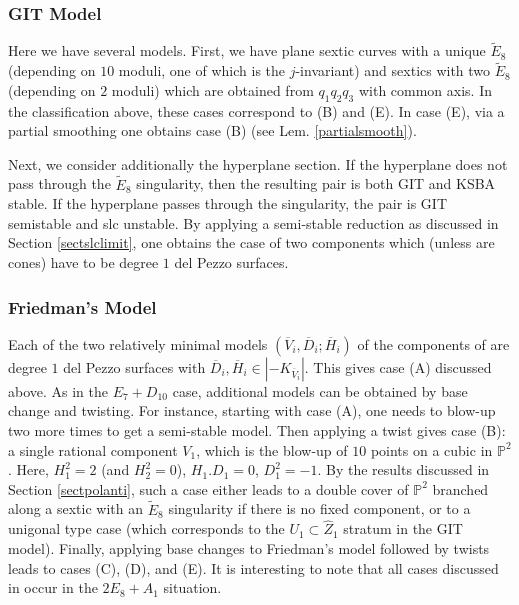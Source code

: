 \documentclass{amsart}
\numberwithin{equation}{section}
\theoremstyle{plain}
\theoremstyle{remark}
\theoremstyle{definition}
\newcommand{\bP}{\mathbb{P}}
\newcommand{\oD}{\overline{D}}
\newcommand{\oV}{\overline{V}}
\newcommand{\oH}{\overline{H}}
\begin{document}
\subsubsection{GIT Model} Here we have several models. First, we have plane sextic curves with a unique $\widetilde E_8$ (depending on $10$ moduli, one of which is the $j$-invariant) and sextics with two $\widetilde E_8$ (depending on $2$ moduli) which are obtained from $q_1q_2 q_3$ with common axis. In the classification above, these cases correspond to (B) and (E). In  case (E), via a partial smoothing one obtains case (B) (see Lem. \ref{partialsmooth}). 

Next, we consider additionally the hyperplane section. If the hyperplane does not pass through the $\widetilde E_8$ singularity, then the resulting pair is both GIT and KSBA stable. If the hyperplane passes through the singularity, the pair is GIT semistable and slc unstable. By applying a semi-stable reduction as discussed in Section \ref{sectslclimit}, one obtains the case of two components which (unless are cones) have to be degree $1$ del Pezzo surfaces. 



\subsubsection{Friedman's Model} Each of the two relatively minimal models $(\oV_i,\oD_i;\oH_i)$  of the components of \cite[(5.2.2)]{friedmanannals}  are degree $1$ del Pezzo surfaces with $\oD_i, \oH_i\in |-K_{\oV_i}|$. 
 This gives case (A) discussed above. As in the $E_7+D_{10}$ case, additional models can be obtained by base change and twisting. For instance, starting with  case (A), one needs to blow-up two more times to get a semi-stable model. Then applying a twist gives case (B): a single rational component $V_1$, which    is the blow-up of $10$ points on a cubic in $\bP^2$. Here, $H_1^2=2$ (and $H_2^2=0$), $H_1.D_1=0$, $D_1^2=-1$. By the results discussed in Section \ref{sectpolanti}, such a case either leads to a double cover of $\bP^2$ branched along a sextic with an $\widetilde E_8$ singularity if there is no fixed component, or to a unigonal type case (which corresponds to the $U_1\subset \widehat Z_1$ stratum in the GIT model). Finally, applying base changes to Friedman's model followed by twists leads to  cases (C), (D), and (E). It is interesting to note that all cases discussed in  \cite[p. 21]{thompson} occur in the $2E_8+A_1$ situation. 
 
\end{document}
